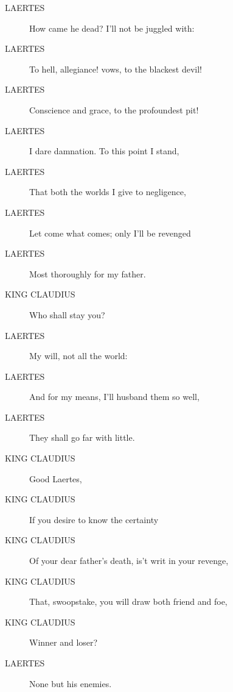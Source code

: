 \documentclass{article}
\begin{document}
\begin{description}
            
\item[LAERTES] How came he dead? I'll not be juggled with:
\item[LAERTES] To hell, allegiance! vows, to the blackest devil!
\item[LAERTES] Conscience and grace, to the profoundest pit!
\item[LAERTES] I dare damnation. To this point I stand,
\item[LAERTES] That both the worlds I give to negligence,
\item[LAERTES] Let come what comes; only I'll be revenged
\item[LAERTES] Most thoroughly for my father.
\end{description}
          
\begin{description}
            
\item[KING CLAUDIUS] Who shall stay you?
\end{description}
          
\begin{description}
            
\item[LAERTES] My will, not all the world:
\item[LAERTES] And for my means, I'll husband them so well,
\item[LAERTES] They shall go far with little.
\end{description}
          
\begin{description}
            
\item[KING CLAUDIUS] Good Laertes,
\item[KING CLAUDIUS] If you desire to know the certainty
\item[KING CLAUDIUS] Of your dear father's death, is't writ in your revenge,
\item[KING CLAUDIUS] That, swoopstake, you will draw both friend and foe,
\item[KING CLAUDIUS] Winner and loser?
\end{description}
          
\begin{description}
            
\item[LAERTES] None but his enemies.
\end{description}
          
\end{document}
